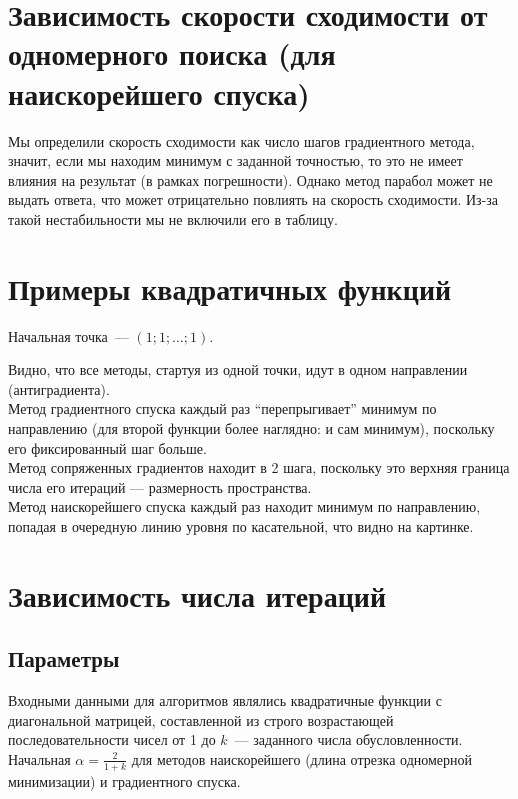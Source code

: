 \documentclass[russian, english]{article}
\begin{document}
\section{Зависимость скорости сходимости от одномерного поиска (для наискорейшего спуска)}
Мы определили скорость сходимости как число шагов градиентного метода, значит, если мы находим минимум с заданной точностью, то это не имеет влияния на результат (в рамках погрешности). Однако метод парабол может не выдать ответа, что может отрицательно повлиять на скорость сходимости. Из-за такой нестабильности мы не включили его в таблицу.


\section{Примеры квадратичных функций}
Начальная точка~--- $(1;1;\dots;1)$.
\par
\noindent{}
\newpage
\noindent{}
\newpage
\noindent{}
\par
Видно, что все методы, стартуя из одной точки, идут в одном направлении (антиградиента). \\
Метод градиентного спуска каждый раз ``перепрыгивает'' минимум по направлению (для второй функции более наглядно: и сам минимум), поскольку его фиксированный шаг больше. \\
Метод сопряженных градиентов находит в 2 шага, поскольку это верхняя граница числа его итераций --- размерность пространства. \\
Метод наискорейшего спуска каждый раз находит минимум по направлению, попадая в очередную линию уровня по касательной, что видно на картинке.
\section{Зависимость числа итераций}
\subsection{Параметры}

Входными данными для алгоритмов являлись квадратичные функции с диагональной матрицей, составленной из строго возрастающей последовательности чисел от 1 до $k$~--- заданного числа обусловленности. Начальная $\alpha=\frac{2}{1+k}$ для методов наискорейшего (длина отрезка одномерной минимизации) и градиентного спуска.
\end{document}
